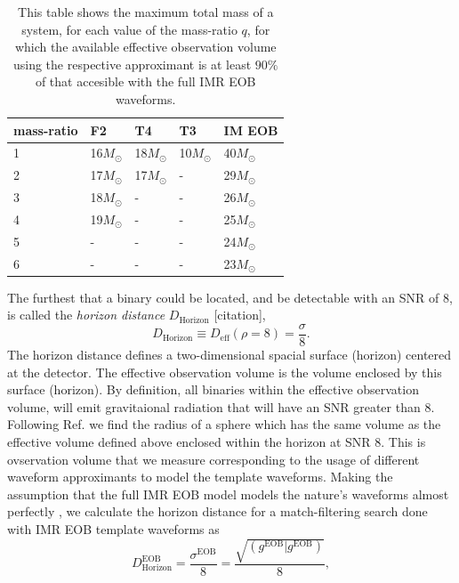 \documentclass[aps,
prd,
amsmath,
amssymb,
twocolumn,
floatfix,
groupedaddress]{revtex4-1}
\newcommand{\eff}{\mathrm{eff}}
\newcommand{\EOB}{\mathrm{EOB}}
\newcommand{\horizon}{\mathrm{Horizon}}
\begin{document}
\begin{table}[h]
\caption{\label{tab:maxTotalMassVeff} This table shows the maximum total mass of a system, for each value of the mass-ratio $q$, for which the available effective observation volume using the respective approximant is at least $90\%$ of that accesible with the full IMR EOB waveforms.}
\begin{ruledtabular}
\begin{tabular}{|m{}| m{}| m{}| m{}| m{}|}
mass-ratio & F2 & T4 & T3 & IM EOB\tabularnewline \hline
1 & 16$M_{\odot}$ & 18$M_{\odot}$ & 10$M_{\odot}$ & 40$M_{\odot}$\tabularnewline \hline
2 & 17$M_{\odot}$ & 17$M_{\odot}$ & - & 29$M_{\odot}$\tabularnewline \hline
3 & 18$M_{\odot}$ & - & - & 26$M_{\odot}$\tabularnewline \hline
4 & 19$M_{\odot}$ & - & - & 25$M_{\odot}$\tabularnewline \hline
5 & - & - & - & 24$M_{\odot}$\tabularnewline \hline
6 & - & - & - & 23$M_{\odot}$\tabularnewline \hline
\end{tabular}
\end{ruledtabular}
\end{table}
The furthest that a binary could be located, and be detectable with an SNR of $8$, is called the \textit{horizon distance} $D_{\horizon}$ [citation],
\begin{equation}
D_{\horizon}\equiv D_{\eff}(\rho = 8) = \dfrac{\sigma}{8}.
\end{equation}
The horizon distance defines a two-dimensional spacial surface (horizon) centered at the detector. The effective observation volume is the volume enclosed by this surface (horizon). By definition, all binaries within the effective observation volume, will emit gravitaional radiation that will have an SNR greater than $8$. Following Ref.\citep{FinnChernoffDA} we find the radius of a sphere which has the same volume as the effective volume defined above enclosed within the horizon at SNR $8$. This is ovservation volume that we measure corresponding to the usage of different waveform approximants to model the template waveforms.\newline
Making the assumption that the full IMR EOB model models the nature's waveforms almost perfectly \citep{EOBNRdevel01}, we calculate the horizon distance for a match-filtering search done with IMR EOB template waveforms as
\begin{equation}\label{eq:DhorizonEOB}
D^{\EOB}_{\horizon} = \dfrac{\sigma^{\EOB}}{8} = \dfrac{\sqrt{(g^{\EOB}|g^{\EOB})}}{8},
\end{equation}
\end{document}
